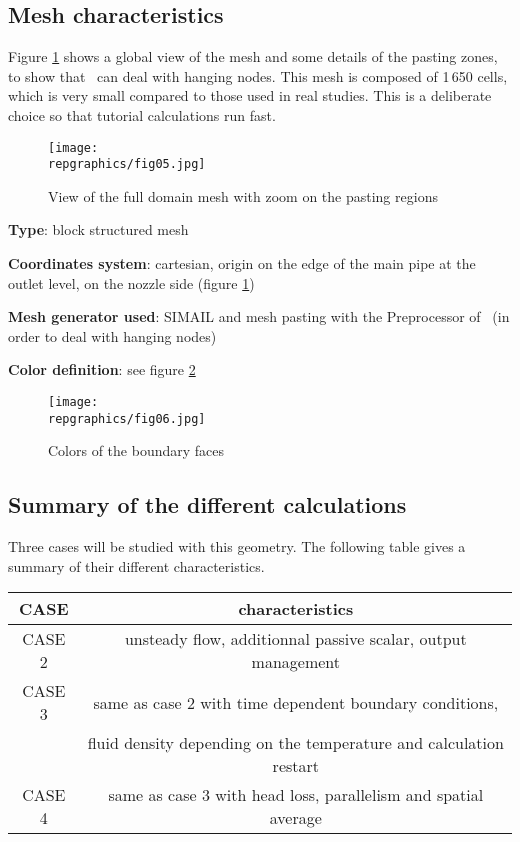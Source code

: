         \subsection{Mesh characteristics}

Figure \ref{figante22} shows a global view of the mesh and some details of
the pasting zones, to show that \CS\ can deal with hanging nodes.
This mesh is composed of 1\,650 cells, which is very small compared to those used in real
studies. This is a deliberate choice so that tutorial calculations run fast.

\begin{figure}[h!]
\begin{center}
\texttt{[image: \\repgraphics/fig05.jpg]}
\caption{View of the full domain mesh with zoom on the pasting regions}
\label{figante22}
\end{center}
\end{figure}

{\bfseries Type}: block structured mesh

{\bfseries Coordinates system}: cartesian, origin on the edge of the main
pipe at the outlet level, on the nozzle side (figure \ref{figante22})

{\bfseries Mesh generator used}: SIMAIL and mesh pasting with the Preprocessor
of \CS\ (in order to deal with hanging nodes)

{\bfseries Color definition}: see figure \ref{figante23}

\begin{figure}[h!]
\begin{center}
\texttt{[image: \\repgraphics/fig06.jpg]}
\caption{Colors of the boundary faces}
\label{figante23}
\end{center}
\end{figure}


        \subsection{Summary of the different calculations}

Three cases will be studied with this geometry. The following table gives a
summary of their different characteristics.
\begin{center}
\begin{tabular}{|c|c|}
\hline
CASE & characteristics \\
\hline
CASE 2 & unsteady flow, additionnal passive scalar, output management \\
\hline
CASE 3 & same as case 2 with time dependent boundary conditions, \\
 &       fluid density depending on the temperature and calculation restart\\
\hline
CASE 4 & same as case 3 with head loss, parallelism and spatial average \\
\hline
\end{tabular}
\end{center}


